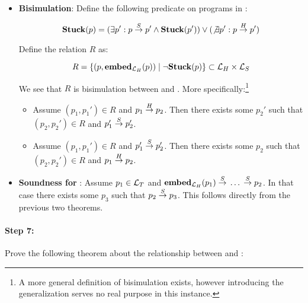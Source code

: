 \begin{itemize}
\item \textbf{Bisimulation}: Define the following predicate on
  programs in \highlang:

  $$\mathbf{Stuck}(p) = (\exists p': p {{}\stackrel{S}{->}{}} p' \land \mathbf{Stuck}(p')) \lor (\not\exists p': p {{}\stackrel{H}{->}{}} p')$$

  Define the relation $R$ as:

  $$R = \{(p, {\mathbf{embed}}_{\mathcal{L}_H}(p)) \mid \neg\mathbf{Stuck}(p)\} \subset \mathcal{L}_H \times
  \mathcal{L}_S$$

  We see that $R$ is bisimulation between \higho{->} and \simpleo{->}. More
  specifically:\footnote{A more general definition of bisimulation exists,
    however introducing the generalization serves no real purpose in this
    instance.}
  \begin{itemize}
  \item Assume $(p_1, p_1') \in R$ and $p_1 {{}\stackrel{H}{->}{}} p_2$. Then there exists
    some $p_2'$ such that $(p_2, p_2') \in R$ and $p_1' {{}\stackrel{S}{->}{}} p_2'$.
  \item Assume $(p_1, p_1') \in R$ and $p_1' {{}\stackrel{S}{->}{}} p_2'$. Then there
    exists some $p_2$ such that $(p_2, p_2') \in R$ and
    $p_1 {{}\stackrel{H}{->}{}} p_2$.
  \end{itemize}
\item \textbf{Soundness for \simplelang}: Assume $p_1 \in \mathcal{L}_T$ and
  ${\mathbf{embed}}_{\mathcal{L}_H}(p_1) {{}\stackrel{S}{->}{}} \dots {{}\ensuremath{\stackrel{S}{->}}{}} p_2$. In that case there
  exists some $p_3$ such that $p_2 {{}\stackrel{S}{->}{}} p_3$. This follows
  directly from the previous two theorems.
\end{itemize}

\paragraph{Step 7:} Prove the following theorem about the relationship between
\simplelang and \nativelang:


